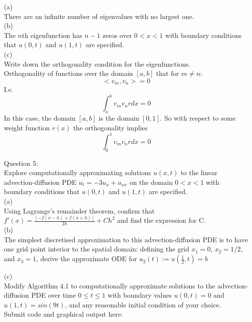 \documentclass[a4paper]{article}
\begin{document}
	(a)\\
	There are an infinite number of eigenvalues with no largest one.\\
	
	(b)\\
	The $n$th eigenfunction has $n-1$ zeros over $0<x<1$ with boundary conditions that $u(0,t)$ and $u(1,t)$ are specified.\\
	
	(c)\\
	Write down the orthogonality condition for the eigenfunctions.\\
	Orthogonality of functions over the domain $[a,b]$  that for $m\neq n$:
	$$<v_m , v_n > =0$$
	I.e.
	$$\int_{a}^{b}v_m v_n r dx = 0$$
	In this case, the domain $[a,b]$ is the domain $[0,1]$. So with respect to some weight function $r(x)$ the orthogonality implies
	$$\int_{0}^{1}v_m v_n r dx = 0$$
	
	\newpage
	Question 5:\\
	Explore computationally approximating solutions $u(x,t)$ to the linear advection-diffusion PDE $u_t=-3u_x+u_{xx}$ on the domain $0<x<1$ with boundary conditions that $u(0,t)$ and $u(1,t)$ are specified.\\
	
	(a)\\
	Using Lagrange's remainder theorem, confirm that $f'(x) = \frac{[-f(x-h)+f(x+h)]}{2h} + Ch^2$ and find the expression for C.\\
	
	(b)\\
	The simplest discretised approximation to this advection-diffusion PDE is to have one grid point interior to the spatial domain: defining the grid $x_1 =0$, $x_2 =1/2$, and $x_3=1$, derive the approximate ODE for $u_2(t):=u(\frac{1}{2},t)=b$
	
	(c)\\
	Modify Algorithm 4.1 to computationally approximate solutions to the advection-diffusion PDE over time $0\le t \le 1$ with boundary values $u(0,t) = 0$ and $u(1,t) = sin(9t)$, and any reasonable initial condition of your choice.\\
	Submit code and graphical output here:
	
	
	
\end{document}
